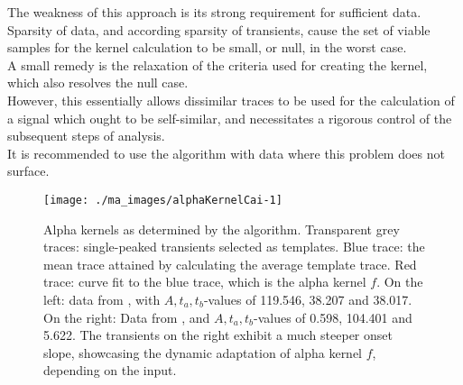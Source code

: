 \documentclass[titlepage]{article}
\begin{document}
The weakness of this approach is its strong requirement for sufficient data.\\
Sparsity of data, and according sparsity of transients, cause the set of viable samples for the kernel calculation to be small, or null, in the worst case.\\
A small remedy is the relaxation of the criteria used for creating the kernel, which also resolves the null case.\\
However, this essentially allows dissimilar traces to be used for the calculation of a signal which ought to be self-similar, and necessitates a rigorous control of the subsequent steps of analysis.\\
It is recommended to use the algorithm with data where this problem does not surface.  
\begin{figure}[h]
\centering
\texttt{[image: ./ma\_images/alphaKernelCai-1]}
\caption{Alpha kernels as determined by the algorithm. Transparent grey traces: single-peaked transients selected as templates. Blue trace: the mean trace attained by calculating the average template trace. Red trace: curve fit to the blue trace, which is the alpha kernel $f$. On the left: data from \citeauthor{akerboom_optimization_2012}\cite{akerboom_optimization_2012}, with $A,t_a,t_b$-values of 119.546, 38.207 and 38.017.
On the right: Data from \citeauthor{chen_ultrasensitive_2013}\cite{chen_ultrasensitive_2013}, and $A,t_a,t_b$-values of 0.598, 104.401 and 5.622. The transients on the right exhibit a much steeper onset slope, showcasing the dynamic adaptation of alpha kernel $f$, depending on the input.}
\label{fig:alphaKernelCai-1}
\end{figure}
\end{document}
